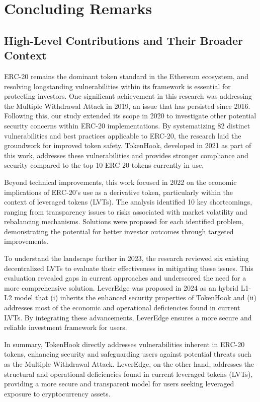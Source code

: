 
\chapter{Concluding Remarks}\label{ch:remarks}
\section{High-Level Contributions and Their Broader Context}
ERC-20 remains the dominant token standard in the Ethereum ecosystem, and resolving longstanding vulnerabilities within its framework is essential for protecting investors. One significant achievement in this research was addressing the Multiple Withdrawal Attack in 2019, an issue that has persisted since 2016. Following this, our study extended its scope in 2020 to investigate other potential security concerns within ERC-20 implementations. By systematizing 82 distinct vulnerabilities and best practices applicable to ERC-20, the research laid the groundwork for improved token safety. TokenHook, developed in 2021 as part of this work, addresses these vulnerabilities and provides stronger compliance and security compared to the top 10 ERC-20 tokens currently in use.

Beyond technical improvements, this work focused in 2022 on the economic implications of ERC-20's use as a derivative token, particularly within the context of leveraged tokens (LVTs). The analysis identified 10 key shortcomings, ranging from transparency issues to risks associated with market volatility and rebalancing mechanisms. Solutions were proposed for each identified problem, demonstrating the potential for better investor outcomes through targeted improvements.

To understand the landscape further in 2023, the research reviewed six existing decentralized LVTs to evaluate their effectiveness in mitigating these issues. This evaluation revealed gaps in current approaches and underscored the need for a more comprehensive solution. LeverEdge was proposed in 2024 as an hybrid L1-L2 model that (i) inherits the enhanced security properties of TokenHook and (ii) addresses most of the economic and operational deficiencies found in current LVTs. By integrating these advancements, LeverEdge ensures a more secure and reliable investment framework for users.

In summary, TokenHook directly addresses vulnerabilities inherent in ERC-20 tokens, enhancing security and safeguarding users against potential threats such as the Multiple Withdrawal Attack. LeverEdge, on the other hand, addresses the structural and operational deficiencies found in current leveraged tokens (LVTs), providing a more secure and transparent model for users seeking leveraged exposure to cryptocurrency assets.

